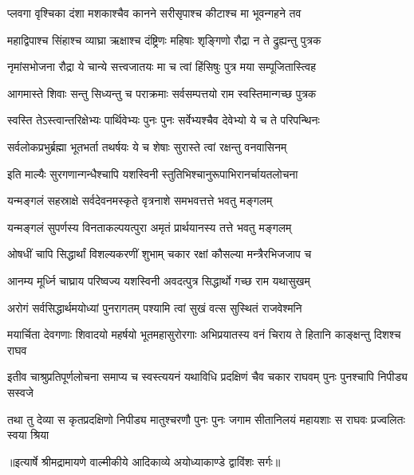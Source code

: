 \twolineshloka
{प्लवगा वृश्चिका दंशा मशकाश्चैव कानने}
{सरीसृपाश्च कीटाश्च मा भूवन्गहने तव} %

\twolineshloka
{महाद्विपाश्च सिंहाश्च व्याघ्रा ऋक्षाश्च दंष्ट्रिणः}
{महिषाः शृङ्गिणो रौद्रा न ते द्रुह्यन्तु पुत्रक} %

\twolineshloka
{नृमांसभोजना रौद्रा ये चान्ये सत्त्वजातयः}
{मा च त्वां हिंसिषुः पुत्र मया सम्पूजितास्त्विह} %

\twolineshloka
{आगमास्ते शिवाः सन्तु सिध्यन्तु च पराक्रमाः}
{सर्वसम्पत्तयो राम स्वस्तिमान्गच्छ पुत्रक} %

\twolineshloka
{स्वस्ति तेऽस्त्वान्तरिक्षेभ्यः पार्थिवेभ्यः पुनः पुनः}
{सर्वेभ्यश्चैव देवेभ्यो ये च ते परिपन्थिनः} %

\twolineshloka
{सर्वलोकप्रभुर्ब्रह्मा भूतभर्ता तथर्षयः}
{ये च शेषाः सुरास्ते त्वां रक्षन्तु वनवासिनम्} %

\twolineshloka
{इति माल्यैः सुरगणान्गन्धैश्चापि यशस्विनी}
{स्तुतिभिश्चानुरूपाभिरानर्चायतलोचना} %

\twolineshloka
{यन्मङ्गलं सहस्राक्षे सर्वदेवनमस्कृते}
{वृत्रनाशे समभवत्तत्ते भवतु मङ्गलम्} %

\twolineshloka
{यन्मङ्गलं सुपर्णस्य विनताकल्पयत्पुरा}
{अमृतं प्रार्थयानस्य तत्ते भवतु मङ्गलम्} %

\twolineshloka
{ओषधीं चापि सिद्धार्थां विशल्यकरणीं शुभाम्}
{चकार रक्षां कौसल्या मन्त्रैरभिजजाप च} %

\twolineshloka
{आनम्य मूर्ध्नि चाघ्राय परिष्वज्य यशस्विनी}
{अवदत्पुत्र सिद्धार्थो गच्छ राम यथासुखम्} %

\twolineshloka
{अरोगं सर्वसिद्धार्थमयोध्यां पुनरागतम्}
{पश्यामि त्वां सुखं वत्स सुस्थितं राजवेश्मनि} %

\fourlineindentedshloka
{मयार्चिता देवगणाः शिवादयो}
{महर्षयो भूतमहासुरोरगाः}
{अभिप्रयातस्य वनं चिराय ते}
{हितानि काङ्क्षन्तु दिशश्च राघव} %

\fourlineindentedshloka
{इतीव चाश्रुप्रतिपूर्णलोचना}
{समाप्य च स्वस्त्ययनं यथाविधि}
{प्रदक्षिणं चैव चकार राघवम्}
{पुनः पुनश्चापि निपीड्य सस्वजे} %

\fourlineindentedshloka
{तथा तु देव्या स कृतप्रदक्षिणो}
{निपीड्य मातुश्चरणौ पुनः पुनः}
{जगाम सीतानिलयं महायशाः}
{स राघवः प्रज्वलितः स्वया श्रिया} %


{॥इत्यार्षे श्रीमद्रामायणे वाल्मीकीये आदिकाव्ये अयोध्याकाण्डे द्वाविंशः सर्गः॥}


